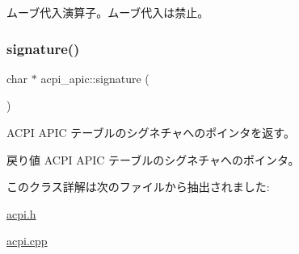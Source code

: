 ムーブ代入演算子。ムーブ代入は禁止。 \hypertarget{classacpi__apic_a7b763605f2e261a30200bdabd26a022c}{}\label{classacpi__apic_a7b763605f2e261a30200bdabd26a022c} 
\subsubsection{\texorpdfstring{signature()}{signature()}}
{\footnotesize\ttfamily char $\ast$ acpi\+\_\+apic\+::signature (\begin{DoxyParamCaption}{ }\end{DoxyParamCaption})}

A\+C\+PI A\+P\+IC テーブルのシグネチャへのポインタを返す。 \begin{DoxyReturn}{戻り値}
A\+C\+PI A\+P\+IC テーブルのシグネチャへのポインタ。 
\end{DoxyReturn}


このクラス詳解は次のファイルから抽出されました\+:\begin{DoxyCompactItemize}
\item 
\hyperlink{acpi_8h}{acpi.\+h}\item 
\hyperlink{acpi_8cpp}{acpi.\+cpp}\end{DoxyCompactItemize}
